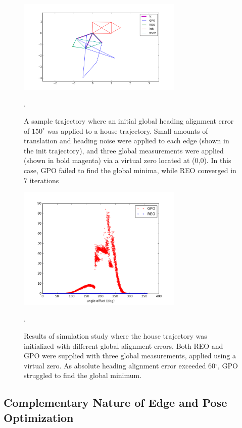 \begin{figure}[H]
  \includegraphics[width=0.7\textwidth]{figures/global_heading_trajectory.png}
  \caption{A sample trajectory where an initial global heading alignment error of $150^\circ$ was applied to a house trajectory.  Small amounts of translation and heading noise were applied to each edge (shown in the init trajectory), and three global measurements were applied (shown in bold magenta) via a virtual zero located at (0,0).  In this case, GPO failed to find the global minima, while REO converged in 7 iterations}
  \label{fig:global_heading_error_trajectory}.
\end{figure}

\begin{figure}[H]
  \includegraphics[width=0.7\textwidth]{figures/REO_vs_GPO_global_measurement.png}
  \caption{Results of simulation study where the house trajectory was initialized with different global alignment errors.  Both REO and GPO were supplied with three global measurements, applied using a virtual zero.  As absolute heading alignment error exceeded 60$^\circ$, GPO struggled to find the global minimum.}
  \label{fig:global_heading_error_results}.
\end{figure}

\subsection{Complementary Nature of Edge and Pose Optimization}

